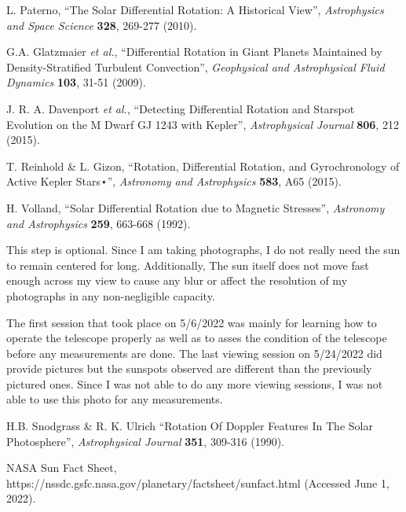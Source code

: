 \documentclass[aps,twocolumn,showpacs,preprintnumbers]{revtex4}
\begin{document}
\begin{thebibliography}{10}

 L. Paterno, ``The Solar Differential Rotation: A Historical View'', {\it Astrophysics and Space Science} {\bf 328}, 269-277 (2010).

 G.A. Glatzmaier {\it et al.},  ``Differential Rotation in Giant Planets Maintained
by Density-Stratified Turbulent Convection'', {\it Geophysical and Astrophysical Fluid Dynamics} {\bf 103}, 31-51 (2009).

 J. R. A. Davenport {\it et al.},  ``Detecting Differential Rotation and Starspot Evolution on the M Dwarf GJ 1243 with Kepler'', {\it Astrophysical Journal} {\bf 806}, 212 (2015).

 T. Reinhold \&  L. Gizon,  ``Rotation, Differential Rotation, and Gyrochronology of Active Kepler Stars⋆'', {\it Astronomy and Astrophysics} {\bf 583}, A65 (2015).

 H. Volland, ``Solar Differential Rotation due to Magnetic Stresses'', {\it Astronomy and Astrophysics} {\bf 259}, 663-668 (1992).

 This step is optional. Since I am taking photographs, I do not really need the sun to remain centered for long. Additionally, The sun itself does not move fast enough across my view to cause any blur or affect the resolution of my photographs in any non-negligible capacity.

 The first session that took place on 5/6/2022 was mainly for learning how to operate the telescope properly as well as to asses the condition of the telescope before any measurements are done. The last viewing session on 5/24/2022 did provide pictures but the sunspots observed are different than the previously pictured ones. Since I was not able to do any more viewing sessions, I was not able to use this photo for any measurements.

 H.B. Snodgrass \&  R. K. Ulrich  ``Rotation Of Doppler Features In The Solar Photosphere'', {\it Astrophysical Journal} {\bf 351}, 309-316 (1990).

 NASA  Sun Fact Sheet, https://nssdc.gsfc.nasa.gov/planetary/factsheet/sunfact.html (Accessed June 1, 2022).

\end{thebibliography}
\end{document}
